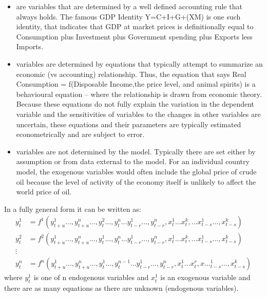 \documentclass[letterpaper,10pt,english]{jupyterBook}
\begin{document}
\sphinxAtStartPar
{}
\begin{itemize}
\item {} 
\sphinxAtStartPar
{} are variables that are determined by a well defined accounting rule that always holds. The famous GDP Identity Y=C+I+G+(X\sphinxhyphen{}M) is one such identity, that indicates that GDP at market prices is definitionally equal to Consumption plus Investment plus Government spending plus Exports less Imports.

\item {} 
\sphinxAtStartPar
{} variables are determined by equations that typically attempt to summarize an economic (vs accounting) relationship. Thus, the equation that says Real Consumption = f(Disposable Income,the price level, and animal spirits) is a behavioural equation – where the relationship is drawn from economic theory. Because these equations do not fully explain the variation in the dependent variable and the sensitivities of variables to the changes in other variables are uncertain, these equations and their parameters are  typically estimated econometrically and are subject to error.

\item {} 
\sphinxAtStartPar
{} variables are not determined by the model. Typically there are set either by assumption or from data external to the model.  For an individual country model, the exogenous variables would often include the global price of crude oil  because the level of activity of the economy itself is unlikely to affect the world price of oil.

\end{itemize}

\sphinxAtStartPar
In a fully general form it can be written as:
\begin{align*}
y_t^1  &=  f^1(y_{t+u}^1...,y_{t+u}^n...,y_t^2...,y_{t}^n...y_{t-r}^1...,y_{t-r}^n,x_t^1...x_{t}^k,...x_{t-s}^1...,x_{t-s}^k) \\
y_t^2  &=  f^2(y_{t+u}^1...,y_{t+u}^n...,y_t^1...,y_{t}^n...y_{t-r}^1...,y_{t-r}^n,x_t^1...x_{t}^k,...x_{t-s}^1...,x_{t-s}^k) \\
\vdots \\
y_t^n  &=  f^n(y_{t+u}^1...,y_{t+u}^n...,y_t^1...,y_{t}^{n-1}...y_{t-r}^1...,y_{t-r}^n,x_t^1...x_{t}^r,x..._{t-s}^1...,x_{t-s}^k)
\end{align*}
\sphinxAtStartPar
where \( y_t^1 \) is one of n endogenous variables and \(x_t^1\) is an exogenous variable and there are as many equations as there are unknown (endogenous variables).
\end{document}
